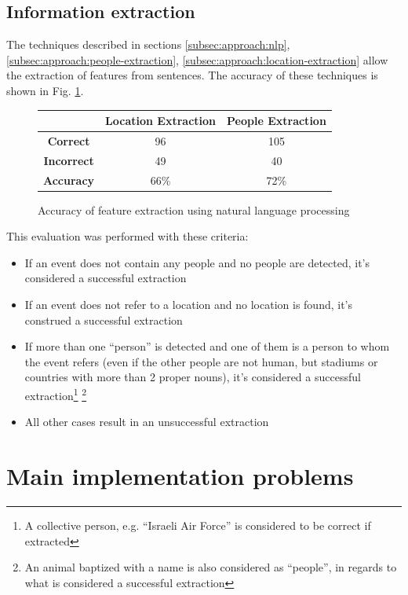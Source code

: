\documentclass{llncs}
\begin{document}
\subsection{Information extraction}

The techniques described in sections \ref{subsec:approach:nlp}, \ref{subsec:approach:people-extraction}, \ref{subsec:approach:location-extraction} allow the extraction of features from sentences. The accuracy of these techniques is shown in Fig. \ref{fig:feature-extraction-accuracy}.

\begin{figure}[h!]
	\centering
	\begin{tabular}{c|c|c}
		& \textbf{Location Extraction} & \textbf{People Extraction} \\
		\hline
		\textbf{Correct}   & 96 & 105 \\
		\textbf{Incorrect} & 49 & 40 \\
		\hline
		\textbf{Accuracy}  & 66\% & 72\% \\ 
	\end{tabular}
	\caption{Accuracy of feature extraction using natural language processing}
	\label{fig:feature-extraction-accuracy}
\end{figure}

This evaluation was performed with these criteria:

\begin{itemize}
	\item If an event does not contain any people and no people are detected, it's considered a successful extraction
	\item If an event does not refer to a location and no location is found, it's construed a successful extraction
	\item If more than one ``person'' is detected and one of them is a person to whom the event refers (even if the other people are not human, but stadiums or countries with more than 2 proper nouns), it's considered a successful extraction\footnote{A collective person, e.g. ``Israeli Air Force'' is considered to be correct if extracted} \footnote{An animal baptized with a name is also considered as ``people'', in regards to what is considered a successful extraction}
	\item All other cases result in an unsuccessful extraction
\end{itemize}

\section{Main implementation problems}
\end{document}
